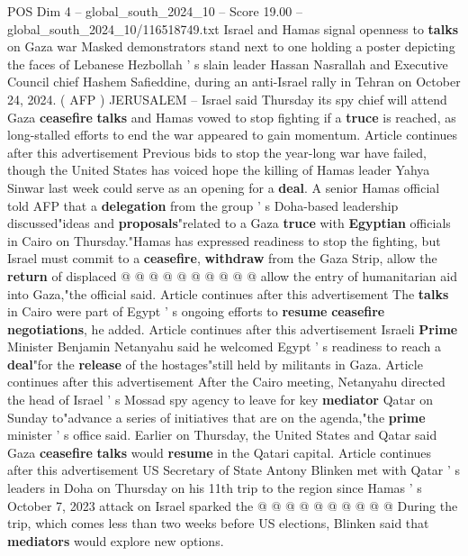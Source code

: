 \begin{textsample}{POS Dim 4 – global\_south\_2024\_10 – Score 19.00 – global\_south\_2024\_10/116518749.txt}  \label{ex:f4_pos_384}
Israel and Hamas signal openness to \textbf{talks} on Gaza war Masked demonstrators stand next to one holding a poster depicting the faces of Lebanese Hezbollah ' s slain leader Hassan Nasrallah and Executive Council chief Hashem Safieddine, during an anti-Israel rally in Tehran on October 24, 2024. ( AFP ) JERUSALEM -- Israel said Thursday its spy chief will attend Gaza \textbf{ceasefire} \textbf{talks} and Hamas vowed to stop fighting if a \textbf{truce} is reached, as long-stalled efforts to end the war appeared to gain momentum.
Article continues after this advertisement Previous bids to stop the year-long war have failed, though the United States has voiced hope the killing of Hamas leader Yahya Sinwar last week could serve as an opening for a \textbf{deal}.
A senior Hamas official told AFP that a \textbf{delegation} from the group ' s Doha-based leadership discussed"ideas and \textbf{proposals}"related to a Gaza \textbf{truce} with \textbf{Egyptian} officials in Cairo on Thursday."Hamas has expressed readiness to stop the fighting, but Israel must commit to a \textbf{ceasefire}, \textbf{withdraw} from the Gaza Strip, allow the \textbf{return} of displaced @ @ @ @ @ @ @ @ @ @ allow the entry of humanitarian aid into Gaza,"the official said.
Article continues after this advertisement The \textbf{talks} in Cairo were part of Egypt ' s ongoing efforts to \textbf{resume} \textbf{ceasefire} \textbf{negotiations}, he added.
Article continues after this advertisement Israeli \textbf{Prime} Minister Benjamin Netanyahu said he welcomed Egypt ' s readiness to reach a \textbf{deal}"for the \textbf{release} of the hostages"still held by militants in Gaza.
Article continues after this advertisement After the Cairo meeting, Netanyahu directed the head of Israel ' s Mossad spy agency to leave for key \textbf{mediator} Qatar on Sunday to"advance a series of initiatives that are on the agenda,"the \textbf{prime} minister ' s office said.
Earlier on Thursday, the United States and Qatar said Gaza \textbf{ceasefire} \textbf{talks} would \textbf{resume} in the Qatari capital.
Article continues after this advertisement US Secretary of State Antony Blinken met with Qatar ' s leaders in Doha on Thursday on his 11th trip to the region since Hamas ' s October 7, 2023 attack on Israel sparked the @ @ @ @ @ @ @ @ @ @ During the trip, which comes less than two weeks before US elections, Blinken said that \textbf{mediators} would explore new options.

\end{textsample}
